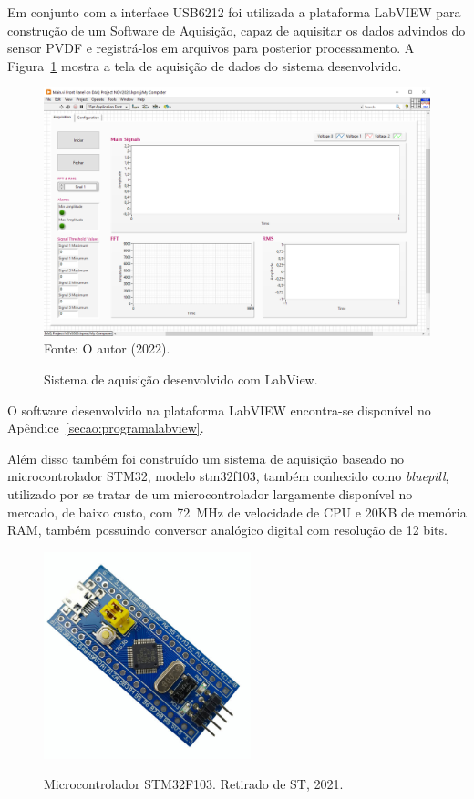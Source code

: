 \documentclass[
	12pt,				
	oneside,			
	a4paper,			
	english,			
	brazil,			
	]{abntex2ppgsi}
\begin{document}
Em conjunto com a interface USB6212 foi utilizada a plataforma LabVIEW para construção de um Software de Aquisição, capaz de aquisitar os dados advindos do sensor PVDF e registrá-los em arquivos para posterior processamento. A Figura~\ref{sistema_labview} mostra a tela de aquisição de dados do sistema desenvolvido. 

\begin{figure}[H]
\centering
\caption {Sistema de aquisição desenvolvido com LabView.}
\includegraphics[width=\textwidth,height=\textheight,keepaspectratio]{sistema_labview} \\
Fonte: O autor (2022).
\label{sistema_labview}
\end{figure} 

O software desenvolvido na plataforma LabVIEW encontra-se disponível no Apêndice~\ref{secao:programalabview}. 

Além disso também foi construído um sistema de aquisição baseado no microcontrolador STM32, modelo stm32f103, também conhecido como \textit{bluepill}, utilizado por se tratar de um microcontrolador largamente disponível no mercado, de baixo custo, com \SI{72}{\mega\hertz} de velocidade de CPU e 20KB de memória RAM, também possuindo conversor analógico digital com resolução de 12 bits. 


\begin{figure}[H]
\centering
\caption {Microcontrolador STM32F103. Retirado de ST, 2021.}
\includegraphics[width=\textwidth,height=60mm,keepaspectratio]{stm32}
\label{stm32}
\end{figure}
\end{document}
